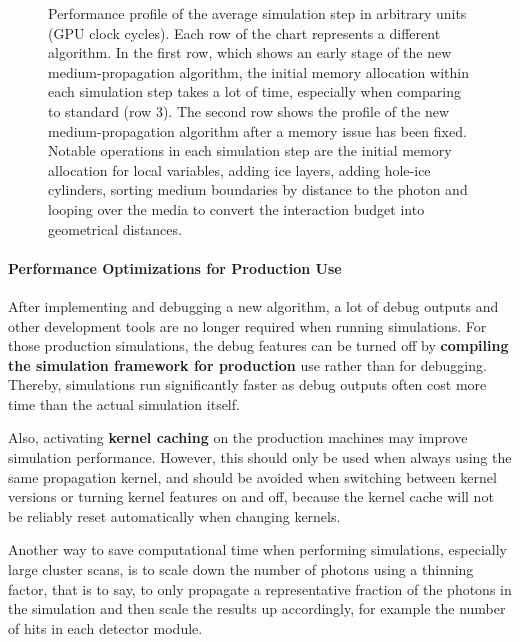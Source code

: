 
\begin{figure}[htbp]
  \caption{Performance profile of the average simulation step in arbitrary units (GPU clock cycles). Each row of the chart represents a different algorithm. In the first row, which shows an early stage of the new medium-propagation algorithm, the initial memory allocation within each simulation step takes a lot of time, especially when comparing to standard \clsim (row 3). The second row shows the profile of the new medium-propagation algorithm after a memory issue has been fixed. Notable operations in each simulation step are the initial memory allocation for local variables, adding ice layers, adding hole-ice cylinders, sorting medium boundaries by distance to the photon and looping over the media to convert the interaction budget into geometrical distances.}
  \label{fig:profiling-paz4Eig6}
\end{figure}


\paragraph{Performance Optimizations for Production Use}
After implementing and debugging a new algorithm, a lot of debug outputs and other development tools are no longer required when running simulations. For those production simulations, the debug features can be turned off by \textbf{compiling the \icecube simulation framework for production} use rather than for debugging. Thereby, simulations run significantly faster as debug outputs often cost more time than the actual simulation itself.


Also, activating \textbf{kernel caching} on the production machines may improve simulation performance. However, this should only be used when always using the same propagation kernel, and should be avoided when switching between kernel versions or turning kernel features on and off, because the kernel cache will not be reliably reset automatically when changing kernels.


\label{sec:thinning}
Another way to save computational time when performing simulations, especially large cluster scans, is to scale down the number of photons using a thinning factor, that is to say, to only propagate a representative fraction of the photons in the simulation and then scale the results up accordingly, for example the number of hits in each detector module.

